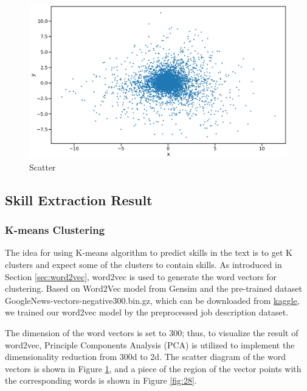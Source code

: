  \begin{figure}[H]
    \centering
    \includegraphics[width=1.0\textwidth]{images/word2vec_scatter.png}
    \caption{Scatter}
    \label{fig:27}
\end{figure}

\subsection{Skill Extraction Result}

\subsubsection{K-means Clustering}

The idea for using K-means algorithm to predict skills in the text is to get K clusters and expect some of the clusters to contain skills. As introduced in Section \ref{sec:word2vec}, word2vec is used to generate the word vectors for clustering. Based on Word2Vec model from Gensim and the pre-trained dataset  GoogleNews-vectors-negative300.bin.gz, which can be downloaded from \href{https://www.kaggle.com/datasets/leadbest/googlenewsvectorsnegative300}{kaggle}, we trained our word2vec model by the preprocessed job description dataset.

The dimension of the word vectors is set to 300; thus, to visualize the result of word2vec, Principle Components Analysis (PCA) is utilized to implement the dimensionality reduction from 300d to 2d. The scatter diagram of the word vectors is shown in Figure \ref{fig:27}, and a piece of the region of the vector points with the corresponding words is shown in Figure \ref{fig:28}.



